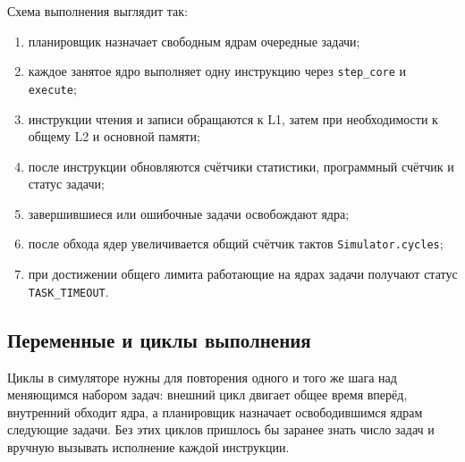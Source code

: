 \documentclass[12pt,a4paper]{article}
\begin{document}
Схема выполнения выглядит так:

\begin{enumerate}[leftmargin=2em]
    \item планировщик назначает свободным ядрам очередные задачи;
    \item каждое занятое ядро выполняет одну инструкцию через \texttt{step\_core} и \texttt{execute};
    \item инструкции чтения и записи обращаются к L1, затем при необходимости к общему L2 и основной памяти;
    \item после инструкции обновляются счётчики статистики, программный счётчик и статус задачи;
    \item завершившиеся или ошибочные задачи освобождают ядра;
    \item после обхода ядер увеличивается общий счётчик тактов \texttt{Simulator.cycles};
    \item при достижении общего лимита работающие на ядрах задачи получают статус \texttt{TASK\_TIMEOUT}.
\end{enumerate}

\subsection{Переменные и циклы выполнения}

Циклы в симуляторе нужны для повторения одного и того же шага над меняющимся набором задач: внешний цикл двигает общее время вперёд, внутренний обходит ядра, а планировщик назначает освободившимся ядрам следующие задачи. Без этих циклов пришлось бы заранее знать число задач и вручную вызывать исполнение каждой инструкции.
\end{document}
